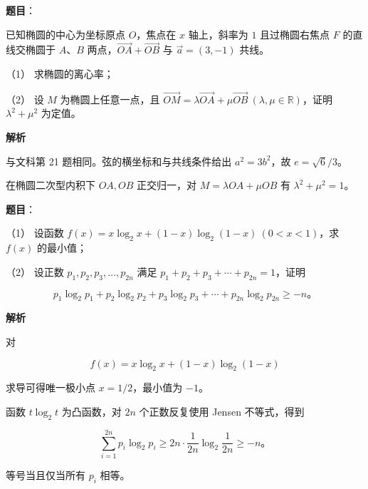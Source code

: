 \begin{answer}

\textbf{题目}：

已知椭圆的中心为坐标原点 $O$，焦点在 $x$ 轴上，斜率为 $1$ 且过椭圆右焦点 $F$ 的直线交椭圆于 $A\text{、}B$ 两点，$\overrightarrow{OA}+\overrightarrow{OB}$ 与 $\vec a=(3,-1)$ 共线。

（1） 求椭圆的离心率；

（2） 设 $M$ 为椭圆上任意一点，且 $\overrightarrow{OM}=\lambda\overrightarrow{OA}+\mu\overrightarrow{OB}\ (\lambda,\mu\in\mathbb R)$，证明 $\lambda^2+\mu^2$ 为定值。


\textbf{解析}


与文科第 21 题相同。弦的横坐标和与共线条件给出 $a^2=3b^2$，故 $e=\sqrt6/3$。


在椭圆二次型内积下 $OA,OB$ 正交归一，对 $M=\lambda OA+\mu OB$ 有 $\lambda^2+\mu^2=1$。



\end{answer}
\begin{answer}

\textbf{题目}：

（1） 设函数 $f(x)=x\log_2x+(1-x)\log_2(1-x)\ (0<x<1)$，求 $f(x)$ 的最小值；

（2） 设正数 $p_1,p_2,p_3,\ldots,p_{2n}$ 满足 $p_1+p_2+p_3+\cdots+p_{2n}=1$，证明

\nopagebreak[4]
\[
p_1\log_2p_1+p_2\log_2p_2+p_3\log_2p_3+\cdots+p_{2n}\log_2p_{2n}\geqslant-n\text{。}
\]

\textbf{解析}


对

\nopagebreak[4]
\[
f(x)=x\log_2x+(1-x)\log_2(1-x)
\]

求导可得唯一极小点 $x=1/2$，最小值为 $-1$。


函数 $t\log_2t$ 为凸函数，对 $2n$ 个正数反复使用 Jensen 不等式，得到

\nopagebreak[4]
\[
\sum_{i=1}^{2n}p_i\log_2p_i
\geqslant 2n\cdot\frac1{2n}\log_2\frac1{2n}
\geqslant-n\text{。}
\]

等号当且仅当所有 $p_i$ 相等。



\end{answer}